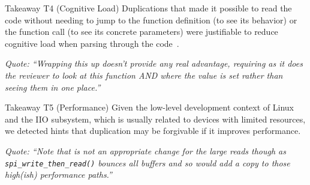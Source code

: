 \documentclass[10pt,conference]{IEEEtran}
\newenvironment{highlight-box}[1]{%
  \begin{tcolorbox}
  \textbf{#1:} \itshape}{\end{tcolorbox}}
\begin{document}
%
\begin{highlight-box}{Takeaway T4 (Cognitive Load)}
  Duplications that made it possible to read the code without needing to jump
  to the function definition (to see its behavior) or the function call (to see
  its concrete parameters) were justifiable to reduce cognitive load when
  parsing through the code~\cite{skylines-cognitive-load}.
\hfill\\

\noindent
\begin{footnotesize}
\textit{
  Quote: ``Wrapping this up doesn't provide any real advantage, requiring as
  it does the reviewer to look at this function AND where the value is set
  rather than seeing them in one place.''
}
\end{footnotesize}
\end{highlight-box}


\begin{highlight-box}{Takeaway T5 (Performance)}
  Given the low-level development context of Linux and the IIO subsystem, which
  is usually related to devices with limited resources, we detected hints that
  duplication may be forgivable if it improves performance.
\hfill\\

\noindent
\begin{footnotesize}
\textit{
  Quote: ``Note that is not an appropriate change for the large reads though
  as \texttt{spi\_write\_then\_read()} bounces all buffers and so would add a
  copy to those high(ish) performance paths.''
}
\end{footnotesize}
\end{highlight-box}
\end{document}
